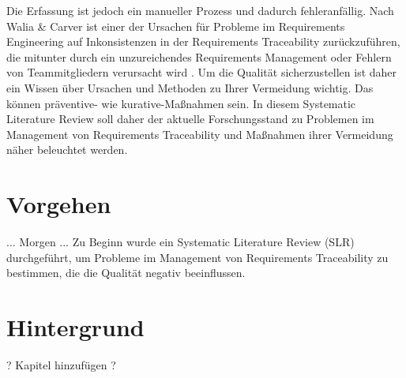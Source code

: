 Die Erfassung ist jedoch ein manueller Prozess und dadurch fehleranfällig. Nach Walia \& Carver ist einer der Ursachen für Probleme im Requirements Engineering auf Inkonsistenzen in der Requirements Traceability zurückzuführen, die mitunter durch ein unzureichendes Requirements Management oder Fehlern von Teammitgliedern verursacht wird \cite{Walia2009AErrors}. Um die Qualität sicherzustellen ist daher ein Wissen über Ursachen und Methoden zu Ihrer Vermeidung wichtig. Das können präventive- wie kurative-Maßnahmen sein. 
In diesem Systematic Literature Review soll daher der aktuelle Forschungsstand zu Problemen im Management von Requirements Traceability und Maßnahmen ihrer Vermeidung näher beleuchtet werden.

\section{Vorgehen}
... Morgen ...
Zu Beginn wurde ein Systematic Literature Review (SLR) durchgeführt, um Probleme im Management von Requirements Traceability zu bestimmen, die die Qualität negativ beeinflussen. 

\section{Hintergrund}

? Kapitel hinzufügen ?